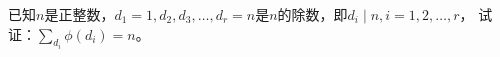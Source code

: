 已知$n$是正整数，$d_1=1,d_2,d_3,\ldots,d_r=n$是$n$的除数，即$d_i\mid n,i=1,2,\ldots,r$，
试证：$\sum_{d_i}\phi(d_i)=n$。
